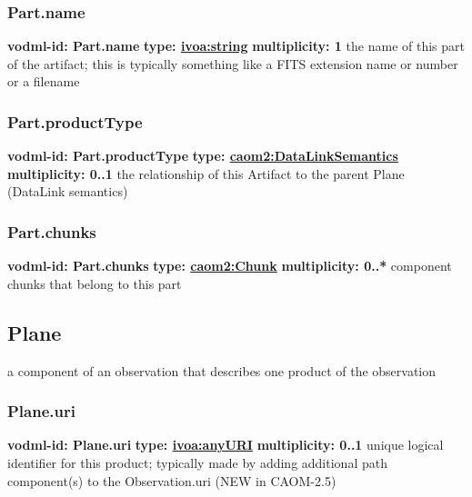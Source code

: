    \subsubsection{Part.name}
      \textbf{vodml-id: Part.name} \newline
      \textbf{type: \hyperref[sect:ivoa]{ivoa:string}} \newline
      \textbf{multiplicity: 1} \newline
      the name of this part of the artifact; this is typically something like a FITS extension name or number or a filename

    \subsubsection{Part.productType}
      \textbf{vodml-id: Part.productType} \newline
      \textbf{type: \hyperref[sect:DataLinkSemantics]{caom2:DataLinkSemantics}} \newline
      \textbf{multiplicity: 0..1} \newline
      the relationship of this Artifact to the parent Plane (DataLink semantics)

    \subsubsection{Part.chunks}
      \textbf{vodml-id: Part.chunks} \newline
      \textbf{type: \hyperref[sect:Chunk]{caom2:Chunk}} \newline
      \textbf{multiplicity: 0..*} \newline
      component chunks that belong to this part

  \subsection{Plane}
  \label{sect:Plane}
    a component of an observation that describes one product of the observation

    \subsubsection{Plane.uri}
      \textbf{vodml-id: Plane.uri} \newline
      \textbf{type: \hyperref[sect:ivoa]{ivoa:anyURI}} \newline
      \textbf{multiplicity: 0..1} \newline
      unique logical identifier for this product; typically made by adding additional path component(s) to the Observation.uri (NEW in CAOM-2.5)

